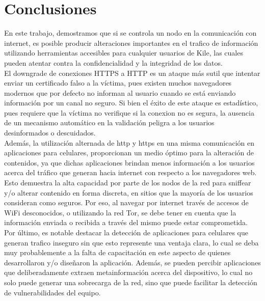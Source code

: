 \section{Conclusiones}

En este trabajo, demostramos que si se controla un nodo en la comunicación con internet, es posible producir alteraciones importantes en el trafico de información utilizando herramientas accesibles para cualquier usuarios de Kile, las cuales pueden atentar contra la confidencialidad y la integridad de los datos.\\

El downgrade de conexiones HTTPS a HTTP es un ataque más sutil que intentar enviar un certificado falso a la víctima, pues existen muchos navegadores modernos que por defecto no informan al usuario cuando se está enviando información por un canal no seguro. Si bien el éxito de este ataque es estadístico, pues requiere que la víctima no verifique si la conexion no es segura, la ausencia de un mecanismo automático en la validación peligra a los usuarios desinformados o descuidados.\\

Además, la utilización alternada de http y https en una misma comunicación en aplicaciones para celulares, proporcionan un medio óptimo para la alteración de contenidos, ya que dichas aplicaciones brindan menos información a los usuarios acerca del tráfico que generan hacia internet con respecto a los navegadores web.\\

Esto demuestra la alta capacidad por parte de los nodos de la red para sniffear y/o alterar contenido en forma discreta, en sitios que la mayoría de los usuarios consideran como seguros. Por eso, al navegar por internet través de accesos de WiFi desconocidos, o utilizando la red Tor, se debe tener en cuenta que la información enviada o recibida a través del mismo puede estar comprometida.\\

Por último, es notable destacar la detección de aplicaciones para celulares que generan trafico inseguro sin que esto represente una ventaja clara, lo cual se deba muy probablemente a la falta de capacitación en este aspecto de quienes desarrollaron y/o diseñaron la aplicación. Además, se pueden percibir aplicaciones que deliberadamente extraen metainformación acerca del dispositivo, lo cual no solo puede generar una sobrecarga de la red, sino que puede facilitar la detección de vulnerabilidades del equipo.
